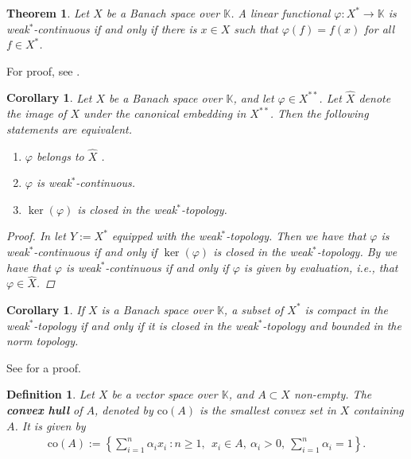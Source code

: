 \documentclass[10pt,twoside,openany,final]{memoir}
\theoremstyle{break}
\newtheorem{theorem}[section]{Theorem}
\newtheorem{corollary}[section]{Corollary}
\newtheorem{definition}[section]{Definition}
\theoremstyle{Break}
\newcommand{\K}{\mathbb{K}}
\begin{document}
\begin{theorem}\label{eval wstar cts}
Let $X$ be a Banach space over $\mathbb{K}$. A linear functional $\varphi\colon X^*\to \K$ is weak$^*$-continuous if and only if there is $x \in X$ such that $\varphi(f)=f(x)$ for all $f \in X^*$. 
\end{theorem}
\noindent For proof, see \cite[Proposition 11][29]{funkannotes}.

\begin{corollary}\label{V.3.11}
Let $X$ be a Banach space over $\mathbb{K}$, and let $\varphi \in X^{**}$.
Let $\hat{X}$ denote the image of $X$ under the canonical embedding in $X^{**}$.
Then the following statements are equivalent.
\begin{enumerate}
\item $\varphi$ belongs to $\hat{X}$ .
\item $\varphi$ is weak$^*$-continuous.
\item $\ker(\varphi)$ is closed in the weak$^*$-topology.
\end{enumerate}
\begin{proof}
In  let $Y:=X^*$ equipped with the weak$^*$-topology. Then we have that $\varphi$ is weak$^*$-continuous if and only if $\ker(\varphi)$ is closed in the weak$^*$-topology. By  we have that $\varphi$ is weak$^*$-continuous if and only if $\varphi$ is given by evaluation, i.e., that $\varphi \in \hat{X}$.
\end{proof}
\end{corollary}

\begin{corollary}
If $X$ is a Banach space over $\mathbb{K}$, a subset of $X^*$ is compact in the weak$^*$-topology if and only if it is closed in the weak$^*$-topology and bounded in the norm topology.
\end{corollary}
\noindent See \cite[Corollary V.4.3][424]{dunford1971linear} for a proof.

\begin{definition}
Let $X$ be a vector space over $\mathbb{K}$, and $A\subset X$ non-empty. The \textbf{convex hull} of $A$, denoted by $\text{co}(A)$ is the smallest convex set in $X$ containing $A$. It is given by
\begin{align*}
\text{co}(A):=\left\{ \sum_{i=1}^n \alpha_{i} x_{i} \ : n \geq 1, \ \ x_{i} \in A,\ \alpha_{i}>0, \ \sum_{i=1}^n \alpha_{i}=1 \right\}.
\end{align*}
\end{definition}
\end{document}
